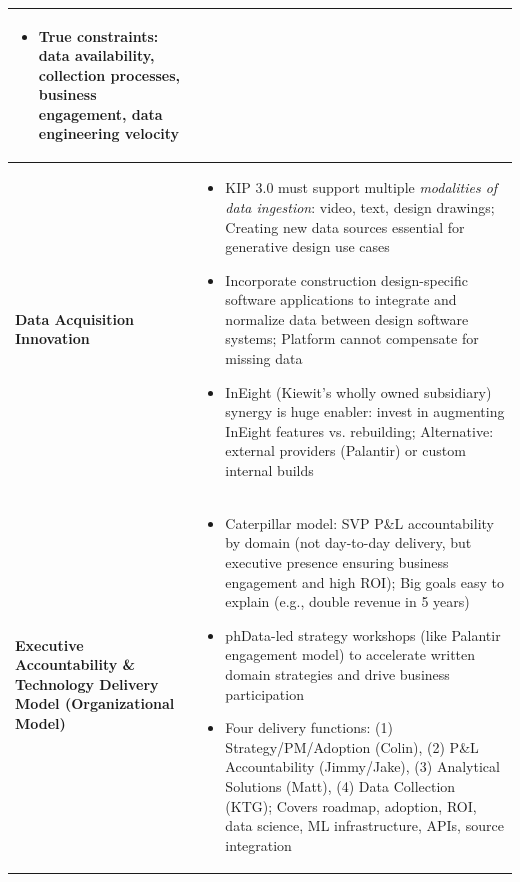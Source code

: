 \documentclass[12pt, a4paper]{article}
\begin{document}
{\begin{tabularx}{\textwidth}{@{}
  >{\raggedright\arraybackslash}p{2.8cm}
  >{\raggedright\arraybackslash}p{\dimexpr\textwidth-2.8cm-2\tabcolsep-\arrayrulewidth\relax}@{}}
\begin{itemize}[leftmargin=*, nosep, topsep=0pt, partopsep=0pt]
  \item True constraints: data availability, collection processes, business engagement, data engineering velocity
\end{itemize} \\
\midrule
\textbf{Data Acquisition Innovation} &
\vspace{-0.5\baselineskip}
\begin{itemize}[leftmargin=*, nosep, topsep=0pt, partopsep=0pt]
  \item KIP 3.0 must support multiple \textit{modalities of data ingestion}: video, text, design drawings; Creating new data sources essential for generative design use cases
  \item Incorporate construction design-specific software applications to integrate and normalize data between design software systems; Platform cannot compensate for missing data
  \item InEight (Kiewit's wholly owned subsidiary) synergy is huge enabler: invest in augmenting InEight features vs. rebuilding; Alternative: external providers (Palantir) or custom internal builds
\end{itemize} \\
\midrule
\textbf{Executive Accountability \& Technology Delivery Model (Organizational Model)} &
\vspace{-0.5\baselineskip}
\begin{itemize}[leftmargin=*, nosep, topsep=0pt, partopsep=0pt]
  \item Caterpillar model: SVP P\&L accountability by domain (not day-to-day delivery, but executive presence ensuring business engagement and high ROI); Big goals easy to explain (e.g., double revenue in 5 years)
  \item phData-led strategy workshops (like Palantir engagement model) to accelerate written domain strategies and drive business participation
  \item Four delivery functions: (1) Strategy/PM/Adoption (Colin), (2) P\&L Accountability (Jimmy/Jake), (3) Analytical Solutions (Matt), (4) Data Collection (KTG); Covers roadmap, adoption, ROI, data science, ML infrastructure, APIs, source integration
\end{itemize} \\
\bottomrule
\end{tabularx}
}

\thispagestyle{empty}
\newpage
\end{document}
